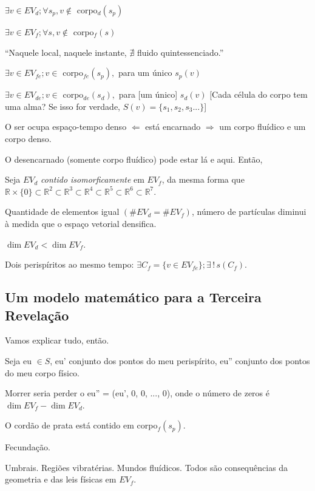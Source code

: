 \documentclass[12pt,a4paper]{article}
\begin{document}
			$\exists v \in EV_d ; \forall s_p, v \notin$ corpo$_d(s_p)$

			$\exists v \in EV_f ; \forall s, v \notin$ corpo$_f(s)$

			\textquotedblleft Naquele local, naquele instante, $\nexists$ fluido quintessenciado.\textquotedblright

			$\exists v \in EV_{fe} ; v \in$ corpo$_{fe}(s_p),$ para um \'unico $s_p(v)$

			$\exists v \in EV_{de} ; v \in$ corpo$_{de}(s_d),$ para [um \'unico] $s_d(v)$ [Cada c\'elula do corpo tem uma alma? Se isso for verdade, $S(v) = \{s_1, s_2, s_3...\}$]

			O ser ocupa espa\c{c}o-tempo denso $\Leftarrow$ est\'a encarnado $\Rightarrow$ um corpo flu\'idico e um corpo denso.

			O desencarnado (somente corpo flu\'idico) pode estar l\'a e aqui. Ent\~ao,

			Seja $EV_d$ \emph{contido isomorficamente} em $EV_f$, da mesma forma que $\mathbb{R} \times \{0\} \subset \mathbb{R}^2 \subset \mathbb{R}^3 \subset \mathbb{R}^4 \subset \mathbb{R}^5 \subset \mathbb{R}^6 \subset \mathbb{R}^7$.

			Quantidade de elementos igual $(\#EV_d = \#EV_f)$, n\'umero de part\'iculas diminui \`a medida que o espa\c{c}o vetorial densifica.

			$\dim EV_d < \dim EV_f$.

			Dois perisp\'iritos ao mesmo tempo: $\exists C_f = \{v \in EV_{fe}\} ; \exists\,!\,s(C_f)$.

			\subsection{Um modelo matem\'atico para a Terceira Revela\c{c}\~ao}

			\begin{flushright}
			\end{flushright}

			Vamos explicar tudo, ent\~ao.

			Seja eu $\in S$, eu' conjunto dos pontos do meu perisp\'irito, eu'' conjunto dos pontos do meu corpo f\'isico.

			Morrer seria perder o eu'' = (eu', 0, 0, ..., 0), onde o n\'umero de zeros \'e $\dim EV_f - \dim EV_d$.

			O cord\~ao de prata est\'a contido em corpo$_f(s_p)$.

			Fecunda\c{c}\~ao.

			Umbrais. Regi\~oes vibrat\'erias. Mundos flu\'idicos. Todos s\~ao consequ\^encias da geometria e das leis f\'isicas em $EV_f$.
\end{document}
